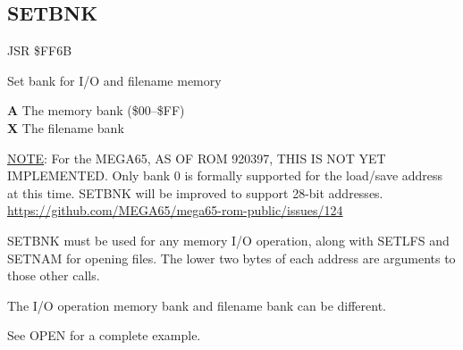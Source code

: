 \subsection{SETBNK}
\label{KERNAL Jump Table!SETBNK}
\begin{description}[leftmargin=2cm,style=nextline]
    \item [Address:] JSR \$FF6B
    \item [Description:] Set bank for I/O and filename memory
    \item [Inputs:]
        \textbf{A} The memory bank (\$00--\$FF) \\
        \textbf{X} The filename bank
    \item [Remarks:]
        \underline{NOTE}: For the MEGA65, AS OF ROM 920397, THIS IS NOT YET IMPLEMENTED. Only bank 0 is formally supported for the load/save address at this time. SETBNK will be improved to support 28-bit addresses. \url{https://github.com/MEGA65/mega65-rom-public/issues/124}

        SETBNK must be used for any memory I/O operation, along with SETLFS and SETNAM for opening files. The lower two bytes of each address are arguments to those other calls.

        The I/O operation memory bank and filename bank can be different.

        See OPEN for a complete example.
    \item [Example:]
\end{description}



\newpage
